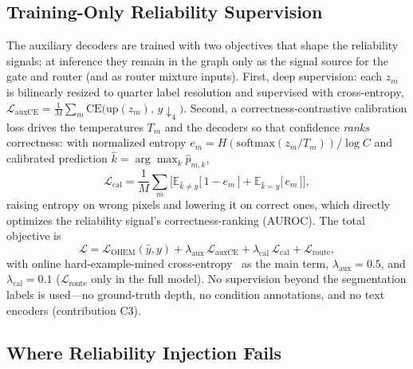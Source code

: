 \subsection{Training-Only Reliability Supervision}
\label{sec:method:training}

The auxiliary decoders are trained with two objectives that shape the
reliability signals; at inference they remain in the graph only as the signal
source for the gate and router (and as router mixture inputs). First, deep
supervision: each $z_m$ is bilinearly resized to quarter label resolution and
supervised with cross-entropy,
$\mathcal{L}_{\mathrm{auxCE}}=\frac{1}{M}\sum_m
\mathrm{CE}\big(\mathrm{up}(z_m),\,y{\downarrow_4}\big)$.
Second, a correctness-contrastive calibration loss drives the temperatures
$T_m$ and the decoders so that confidence \emph{ranks} correctness: with
normalized entropy $e_m = H(\mathrm{softmax}(z_m/T_m))/\log C$ and calibrated
prediction $\hat k=\arg\max_k \hat p_{m,k}$,
\begin{equation}
\mathcal{L}_{\mathrm{cal}} = \frac{1}{M}\sum_{m}\Big[
\mathbb{E}_{\hat k\neq y}\big[\,1-e_m\,\big]
+\mathbb{E}_{\hat k = y}\big[\,e_m\,\big]\Big],
\label{eq:calib}
\end{equation}
raising entropy on wrong pixels and lowering it on correct ones, which
directly optimizes the reliability signal's correctness-ranking (AUROC). The
total objective is
\begin{equation}
\mathcal{L} = \mathcal{L}_{\mathrm{OHEM}}(\hat y, y)
+ \lambda_{\mathrm{aux}}\,\mathcal{L}_{\mathrm{auxCE}}
+ \lambda_{\mathrm{cal}}\,\mathcal{L}_{\mathrm{cal}}
+ \mathcal{L}_{\mathrm{route}},
\label{eq:total}
\end{equation}
with online hard-example-mined cross-entropy~\cite{ohem2016} as the main
term, $\lambda_{\mathrm{aux}}=0.5$, and $\lambda_{\mathrm{cal}}=0.1$
($\mathcal{L}_{\mathrm{route}}$ only in the full model). No supervision
beyond the segmentation labels is used---no ground-truth depth, no condition
annotations, and no text encoders (contribution C3).

\subsection{Where Reliability Injection Fails}
\label{sec:method:negative}

